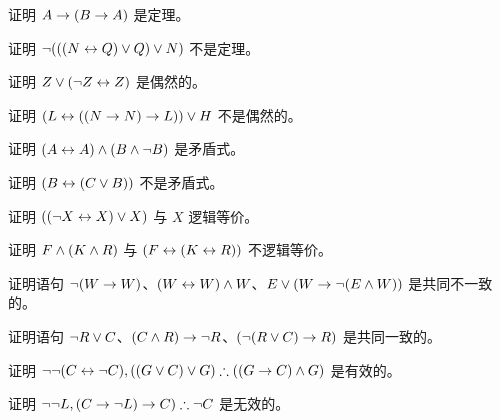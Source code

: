 \begin{compactlist}%
\item 证明 $A \rightarrow (B \rightarrow A)$ 是定理。
\item 证明 $\neg (((N \leftrightarrow Q) \vee Q) \vee N)$ 不是定理。
\item 证明 $ Z \vee (\neg Z \leftrightarrow Z) $ 是偶然的。
\item 证明 $ (L \leftrightarrow ((N \rightarrow N) \rightarrow L)) \vee H $ 不是偶然的。
\item 证明 $ (A \leftrightarrow A) \wedge (B \wedge \neg B)$ 是矛盾式。
\item 证明 $ (B \leftrightarrow (C \vee B)) $ 不是矛盾式。
\item 证明 $ ((\neg X \leftrightarrow X) \vee X) $ 与 $X$ 逻辑等价。
\item 证明 $F \wedge (K \wedge R) $ 与 $ (F \leftrightarrow (K \leftrightarrow R)) $ 不逻辑等价。
\item 证明语句 $ \neg (W \rightarrow W)$、$(W \leftrightarrow W) \wedge W$、$E \vee (W \rightarrow \neg (E \wedge W))$ 是共同不一致的。
\item 证明语句  $\neg R \vee C $、$(C \wedge R) \rightarrow \neg R$、$(\neg (R \vee C) \rightarrow R) $ 是共同一致的。
\item 证明 $\enot \enot (C \eiff \enot C), ((G \eor C) \eor G) \therefore ((G \eif C) \eand G) $ 是有效的。
\item 证明 $ \enot \enot L,  (C \eif \enot L) \eif C) \therefore \enot C$ 是无效的。
\end{compactlist}
